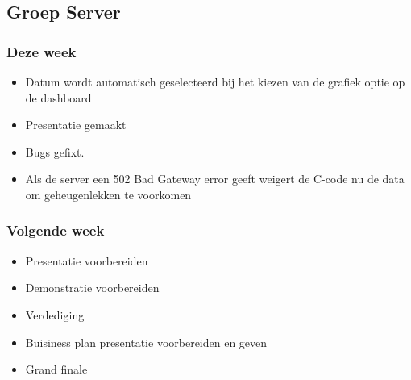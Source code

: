 \subsection*{Groep Server}
\subsubsection*{Deze week}
\begin{itemize}
\item Datum wordt automatisch geselecteerd bij het kiezen van de grafiek optie op de dashboard
\item Presentatie gemaakt
\item Bugs gefixt.
\item Als de server een 502 Bad Gateway error geeft weigert de C-code nu de data om geheugenlekken te voorkomen
\end{itemize}
\subsubsection*{Volgende week}
\begin{itemize}
\item Presentatie voorbereiden
\item Demonstratie voorbereiden
\item Verdediging
\item Buisiness plan presentatie voorbereiden en geven
\item Grand finale
\end{itemize}
